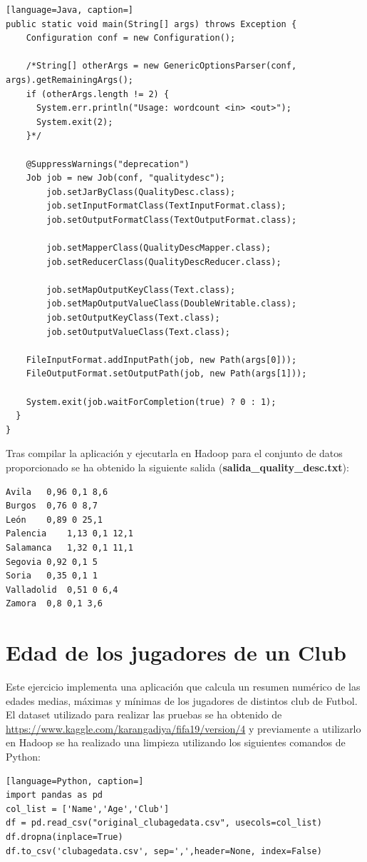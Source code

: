 \documentclass[10pt,swedish, openany]{book}
\begin{document}
\begin{lstlisting}[language=Java, caption=]
public static void main(String[] args) throws Exception {
    Configuration conf = new Configuration();

    /*String[] otherArgs = new GenericOptionsParser(conf, args).getRemainingArgs();
    if (otherArgs.length != 2) {
      System.err.println("Usage: wordcount <in> <out>");
      System.exit(2);
    }*/

    @SuppressWarnings("deprecation")
    Job job = new Job(conf, "qualitydesc");
		job.setJarByClass(QualityDesc.class);
		job.setInputFormatClass(TextInputFormat.class);
		job.setOutputFormatClass(TextOutputFormat.class);

		job.setMapperClass(QualityDescMapper.class);
		job.setReducerClass(QualityDescReducer.class);

		job.setMapOutputKeyClass(Text.class);
		job.setMapOutputValueClass(DoubleWritable.class);
		job.setOutputKeyClass(Text.class);
		job.setOutputValueClass(Text.class);

    FileInputFormat.addInputPath(job, new Path(args[0]));
    FileOutputFormat.setOutputPath(job, new Path(args[1]));

    System.exit(job.waitForCompletion(true) ? 0 : 1);
  }
}
\end{lstlisting}

Tras compilar la aplicación y ejecutarla en Hadoop para el conjunto de datos proporcionado se ha obtenido la siguiente salida (\textbf{salida\_quality\_desc.txt}):
\begin{verbatim}
Avila	0,96 0,1 8,6
Burgos	0,76 0 8,7
León	0,89 0 25,1
Palencia	1,13 0,1 12,1
Salamanca	1,32 0,1 11,1
Segovia	0,92 0,1 5
Soria	0,35 0,1 1
Valladolid	0,51 0 6,4
Zamora	0,8 0,1 3,6
\end{verbatim}

\section{Edad de los jugadores de un Club}
Este ejercicio implementa una aplicación que calcula un resumen numérico de las edades medias, máximas y mínimas de los jugadores de distintos club de Futbol. El dataset utilizado para realizar las pruebas se ha obtenido de \url{https://www.kaggle.com/karangadiya/fifa19/version/4} y previamente a utilizarlo en Hadoop se ha realizado una limpieza utilizando los siguientes comandos de Python:
\begin{lstlisting}[language=Python, caption=]
import pandas as pd
col_list = ['Name','Age','Club']
df = pd.read_csv("original_clubagedata.csv", usecols=col_list)
df.dropna(inplace=True)
df.to_csv('clubagedata.csv', sep=',',header=None, index=False)
\end{lstlisting}
\end{document}
